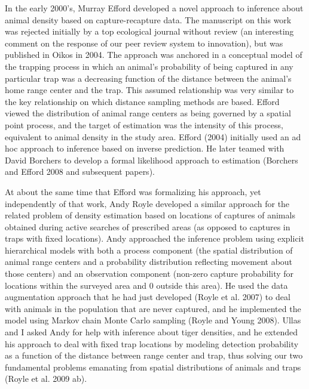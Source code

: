  In the early 2000's, Murray Efford developed a novel
approach to inference about animal density based on capture-recapture
data. The manuscript on this work was rejected initially by a top
ecological journal without review (an interesting comment on the
response of our peer review system to innovation), but was published
in Oikos in 2004. The approach was anchored in a conceptual model of
the trapping process in which an animal's probability of being
captured in any particular trap was a decreasing function of the
distance between the animal's home range center and the trap. This
assumed relationship was very similar to the key relationship on which
distance sampling methods are based. Efford viewed the distribution of
animal range centers as being governed by a spatial point process, and
the target of estimation was the intensity of this process, equivalent
to animal density in the study area. Efford (2004) initially used an
ad hoc approach to inference based on inverse prediction. He later
teamed with David Borchers to develop a formal likelihood approach to
estimation (Borchers and Efford 2008 and subsequent papers).  


At about
the same time that Efford was formalizing his approach, yet
independently of that work, Andy Royle developed a similar approach
for the related problem of density estimation based on locations of
captures of animals obtained during active searches of prescribed
areas (as opposed to captures in traps with fixed locations). Andy
approached the inference problem using explicit hierarchical models
with both a process component (the spatial distribution of animal
range centers and a probability distribution reflecting movement about
those centers) and an observation component (non-zero capture
probability for locations within the surveyed area and 0 outside this
area). He used the data augmentation approach that he had just
developed (Royle et al. 2007) to deal with animals in the population
that are never captured, and he implemented the model using Markov
chain Monte Carlo sampling (Royle and Young 2008).  Ullas and I asked
Andy for help with inference about tiger densities, and he extended
his approach to deal with fixed trap locations by modeling detection
probability as a function of the distance between range center and
trap, thus solving our two fundamental problems emanating from spatial
distributions of animals and traps (Royle et al. 2009 ab).  

